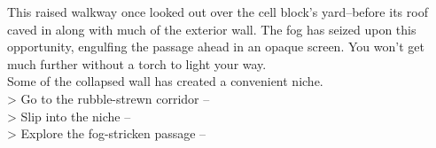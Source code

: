 This raised walkway once looked out over the cell block’s yard--before its roof caved in along with much of the exterior wall. The fog has seized upon this opportunity, engulfing the passage ahead in an opaque screen. You won’t get much further without a torch to light your way.\\

Some of the collapsed wall has created a convenient niche.\\

> Go to the rubble-strewn corridor -- \\
> Slip into the niche -- \\
> Explore the fog-stricken passage -- 